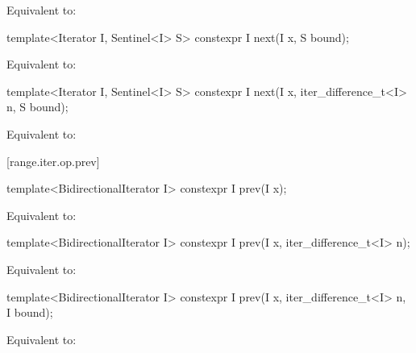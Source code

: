 \begin{itemdescr}
\pnum
\effects Equivalent to: 
\end{itemdescr}

%
\begin{itemdecl}
template<Iterator I, Sentinel<I> S>
  constexpr I next(I x, S bound);
\end{itemdecl}

\begin{itemdescr}
\pnum
\effects Equivalent to: 
\end{itemdescr}

%
\begin{itemdecl}
template<Iterator I, Sentinel<I> S>
  constexpr I next(I x, iter_difference_t<I> n, S bound);
\end{itemdecl}

\begin{itemdescr}
\pnum
\effects Equivalent to: 
\end{itemdescr}

[range.iter.op.prev]{}
%
\begin{itemdecl}
template<BidirectionalIterator I>
  constexpr I prev(I x);
\end{itemdecl}

\begin{itemdescr}
\pnum
\effects Equivalent to: 
\end{itemdescr}

%
\begin{itemdecl}
template<BidirectionalIterator I>
  constexpr I prev(I x, iter_difference_t<I> n);
\end{itemdecl}

\begin{itemdescr}
\pnum
\effects Equivalent to: 
\end{itemdescr}

%
\begin{itemdecl}
template<BidirectionalIterator I>
  constexpr I prev(I x, iter_difference_t<I> n, I bound);
\end{itemdecl}

\begin{itemdescr}
\pnum
\effects Equivalent to: 
\end{itemdescr}

